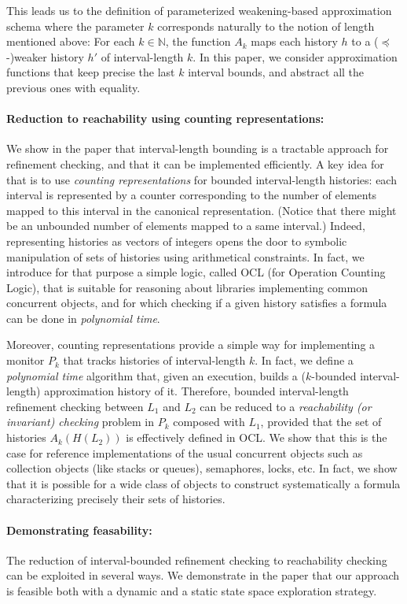 This leads us to the definition of parameterized weakening-based approximation schema where the parameter $k$ corresponds naturally to the notion of length mentioned above: For each $k \in \mathbb{N}$, the function $A_k$ maps each history $h$ to a ($\preceq$-)weaker history $h'$ of interval-length $k$. In this paper, we consider approximation functions that keep precise the last $k$ interval bounds, and abstract all the previous ones with equality.

\paragraph{Reduction to reachability using counting representations:} We show in the paper that interval-length bounding is a tractable approach for refinement checking, and that it can be implemented efficiently. A key idea for that is to use {\em counting representations} for bounded interval-length histories: each interval is represented by a counter corresponding to the number of elements mapped to this interval in the canonical representation. (Notice that there might be an unbounded number of elements mapped to a same interval.)
Indeed, representing histories as vectors of integers opens the door to symbolic manipulation of sets of histories using arithmetical constraints. In fact, we introduce for that purpose a simple logic, called OCL (for Operation Counting Logic), that is suitable for reasoning about libraries implementing common concurrent objects, and for which checking if a given history satisfies a formula can be done in {\em polynomial time}. 

Moreover, counting representations provide a simple way for implementing a monitor $P_k$ that tracks histories of interval-length $k$. In fact, we define a {\em polynomial time} algorithm that, given an execution, builds a ($k$-bounded interval-length) approximation history of it. Therefore, bounded interval-length refinement checking between $L_1$ and $L_2$ can be reduced to a {\em reachability (or invariant) checking} problem in $P_k$ composed with $L_1$, provided that the set of histories $A_k(H(L_2))$ is effectively defined in OCL. We show that this is the case for reference implementations of the usual concurrent objects such as collection objects (like stacks or queues), semaphores, locks, etc. In fact, we show that it is possible for a wide class of objects to construct systematically a formula characterizing precisely their sets of histories.

\paragraph{Demonstrating feasability:} The reduction of interval-bounded refinement checking to reachability checking can be exploited in several ways. We demonstrate in the paper that our approach is feasible both with a dynamic and a static state space exploration strategy. 

